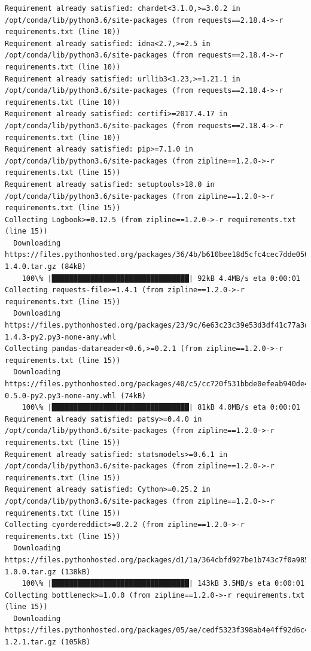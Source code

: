 \documentclass[11pt]{article}
\begin{document}
\begin{Verbatim}[commandchars=\\\{\}]
Requirement already satisfied: chardet<3.1.0,>=3.0.2 in /opt/conda/lib/python3.6/site-packages (from requests==2.18.4->-r requirements.txt (line 10))
Requirement already satisfied: idna<2.7,>=2.5 in /opt/conda/lib/python3.6/site-packages (from requests==2.18.4->-r requirements.txt (line 10))
Requirement already satisfied: urllib3<1.23,>=1.21.1 in /opt/conda/lib/python3.6/site-packages (from requests==2.18.4->-r requirements.txt (line 10))
Requirement already satisfied: certifi>=2017.4.17 in /opt/conda/lib/python3.6/site-packages (from requests==2.18.4->-r requirements.txt (line 10))
Requirement already satisfied: pip>=7.1.0 in /opt/conda/lib/python3.6/site-packages (from zipline==1.2.0->-r requirements.txt (line 15))
Requirement already satisfied: setuptools>18.0 in /opt/conda/lib/python3.6/site-packages (from zipline==1.2.0->-r requirements.txt (line 15))
Collecting Logbook>=0.12.5 (from zipline==1.2.0->-r requirements.txt (line 15))
  Downloading https://files.pythonhosted.org/packages/36/4b/b610bee18d5cfc4cec7dde056639994e9b34991e4c57816bfff0f3d0ac33/Logbook-1.4.0.tar.gz (84kB)
    100\% |████████████████████████████████| 92kB 4.4MB/s eta 0:00:01
Collecting requests-file>=1.4.1 (from zipline==1.2.0->-r requirements.txt (line 15))
  Downloading https://files.pythonhosted.org/packages/23/9c/6e63c23c39e53d3df41c77a3d05a49a42c4e1383a6d2a5e3233161b89dbf/requests\_file-1.4.3-py2.py3-none-any.whl
Collecting pandas-datareader<0.6,>=0.2.1 (from zipline==1.2.0->-r requirements.txt (line 15))
  Downloading https://files.pythonhosted.org/packages/40/c5/cc720f531bbde0efeab940de400d0fcc95e87770a3abcd7f90d6d52a3302/pandas\_datareader-0.5.0-py2.py3-none-any.whl (74kB)
    100\% |████████████████████████████████| 81kB 4.0MB/s eta 0:00:01
Requirement already satisfied: patsy>=0.4.0 in /opt/conda/lib/python3.6/site-packages (from zipline==1.2.0->-r requirements.txt (line 15))
Requirement already satisfied: statsmodels>=0.6.1 in /opt/conda/lib/python3.6/site-packages (from zipline==1.2.0->-r requirements.txt (line 15))
Requirement already satisfied: Cython>=0.25.2 in /opt/conda/lib/python3.6/site-packages (from zipline==1.2.0->-r requirements.txt (line 15))
Collecting cyordereddict>=0.2.2 (from zipline==1.2.0->-r requirements.txt (line 15))
  Downloading https://files.pythonhosted.org/packages/d1/1a/364cbfd927be1b743c7f0a985a7f1f7e8a51469619f9fefe4ee9240ba210/cyordereddict-1.0.0.tar.gz (138kB)
    100\% |████████████████████████████████| 143kB 3.5MB/s eta 0:00:01
Collecting bottleneck>=1.0.0 (from zipline==1.2.0->-r requirements.txt (line 15))
  Downloading https://files.pythonhosted.org/packages/05/ae/cedf5323f398ab4e4ff92d6c431a3e1c6a186f9b41ab3e8258dff786a290/Bottleneck-1.2.1.tar.gz (105kB)

\end{Verbatim}
\end{document}
